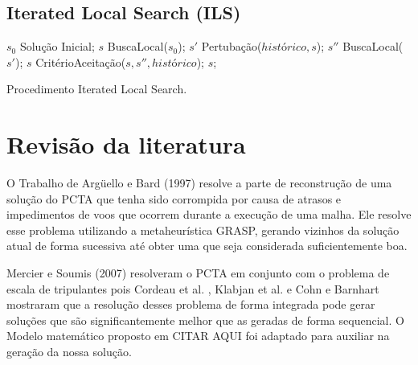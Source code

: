 \subsection{Iterated Local Search (ILS)}

\begin{pgrm}
\begin{programma}
\STATE $s_{0}$ \GETS Solução Inicial;
\STATE $s$ \GETS BuscaLocal($s_{0}$);
\STATE $s{'}$ \GETS Pertubação($histórico, s$);
\STATE $s{''}$ \GETS BuscaLocal($s{'}$);
\STATE $s$ \GETS CritérioAceitação($s, s{''}, histórico$);
\ENDWHILE
\STATE\RETURN $s$;
\ENDALGORITHM
\end{programma}
\caption{Procedimento Iterated Local Search.}\label{alg:ils}
\end{pgrm}

\section{Revisão da literatura}
		
		O Trabalho de Argüello e Bard \citep{arguelo1007} (1997) resolve a parte de reconstrução de uma solução do PCTA que tenha sido corrompida por causa de atrasos e impedimentos de voos que ocorrem durante a execução de uma malha. Ele resolve esse problema utilizando a metaheurística GRASP, gerando vizinhos da solução atual de forma sucessiva até obter uma que seja considerada suficientemente boa.
		
		Mercier e Soumis \cite{mercier2007} (2007) resolveram o PCTA em conjunto com o problema de escala de tripulantes pois Cordeau et al. \cite{cordeau2001}, Klabjan et al. \cite{klabjan2002} e Cohn e Barnhart \cite{mainville2003} mostraram que a resolução desses problema de forma integrada pode gerar soluções que são significantemente melhor que as geradas de forma sequencial. O Modelo matemático proposto em CITAR AQUI foi adaptado para auxiliar na geração da nossa solução. 
		
